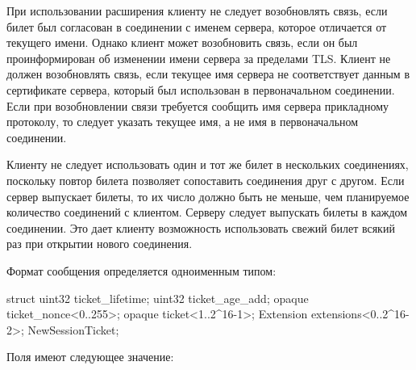 При использовании расширения  клиенту
не следует возобновлять связь, если билет был согласован в соединении с именем 
сервера, которое отличается от текущего имени.
%
%
Однако клиент может возобновить связь, если он был проинформирован об изменении 
имени сервера за пределами TLS.
%
Клиент не должен возобновлять связь, если текущее имя сервера не соответствует 
данным в сертификате сервера, который был использован в первоначальном соединении.
%
Если при возобновлении связи требуется сообщить имя сервера прикладному 
протоколу, то следует указать текущее имя, а не имя в первоначальном соединении.
%

Клиенту не следует использовать один и тот же билет в нескольких соединениях,
поскольку повтор билета позволяет сопоставить соединения друг с другом.
%
Если сервер выпускает билеты, то их число должно быть не меньше, чем 
планируемое количество соединений с клиентом.
%
Серверу следует выпускать билеты в каждом соединении. Это дает клиенту 
возможность использовать свежий билет всякий раз при открытии нового 
соединения.


Формат сообщения  определяется одноименным типом:
%
\begin{codeblock}
struct {
  uint32 ticket_lifetime;
  uint32 ticket_age_add;
  opaque ticket_nonce<0..255>;
  opaque ticket<1..2^16-1>;
  Extension extensions<0..2^16-2>;
} NewSessionTicket;
\end{codeblock}

Поля  имеют следующее значение:

